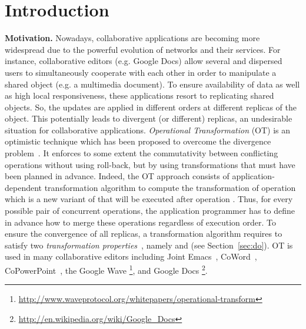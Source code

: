 \documentclass[submission,copyright,creativecommons]{eptcs}
\begin{document}
\section{Introduction}
\noindent\textbf{Motivation.}
Nowadays, collaborative applications are becoming more widespread
due to the powerful evolution of networks and their services. For instance, collaborative editors (e.g. Google Docs) allow several and dispersed users to simultaneously cooperate  with each other in order to manipulate a shared object (e.g. a multimedia document). To ensure availability of data as well as high local responsiveness, these applications resort to replicating shared objects.
So, the updates are applied in different orders
at different replicas of the object. This potentially leads to divergent (or different)
replicas, an undesirable situation for collaborative applications.
\emph{Operational Transformation} (OT) is an optimistic technique which has been proposed to overcome the
divergence problem~\cite{Ellis89,Sun98}. It
enforces to some extent the commutativity between conflicting
operations without using roll-back, but by using transformations that must have been planned in advance.
Indeed, the OT approach consists of application-dependent transformation algorithm  to compute
the transformation of operation   which is a  new variant of  that will be executed after operation . Thus, for every possible pair of concurrent
operations, the application programmer has to define in advance how to merge these operations regardless of execution
order. 
To ensure the convergence of all replicas, a transformation algorithm requires to   satisfy   two \emph{transformation
properties}~\cite{Ressel.ea:96}, namely  and  (see Section~\ref{sec:do}).
OT is used in many
collaborative editors including Joint Emacs~\cite{Ressel.ea:96}, CoWord~\cite{Sun06}, CoPowerPoint~\cite{Sun06}, the Google Wave \footnote{\url{http://www.waveprotocol.org/whitepapers/operational-transform}}, and Google Docs \footnote{\url{http://en.wikipedia.org/wiki/Google_Docs}}.
\end{document}
